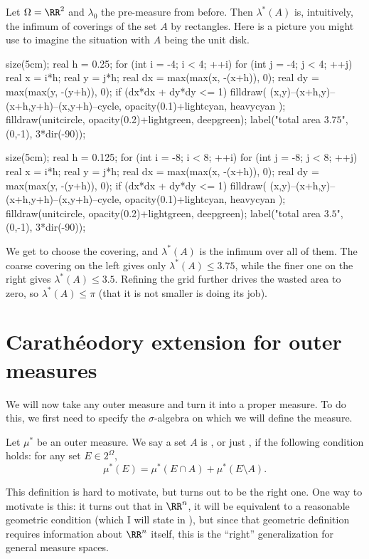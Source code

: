 \begin{example}
	Let $\Omega = \RR^2$ and $\lambda_0$ the pre-measure from before.
	Then $\lambda^\ast(A)$ is, intuitively,
	the infimum of coverings of the set $A$ by rectangles.
	Here is a picture you might use to imagine the
	situation with $A$ being the unit disk.
	\begin{center}
	\begin{asy}
		size(5cm);
		real h = 0.25;
		for (int i = -4; i < 4; ++i) {
			for (int j = -4; j < 4; ++j) {
				real x = i*h;
				real y = j*h;
				real dx = max(max(x, -(x+h)), 0);
				real dy = max(max(y, -(y+h)), 0);
				if (dx*dx + dy*dy <= 1)
					filldraw( (x,y)--(x+h,y)--(x+h,y+h)--(x,y+h)--cycle,
						opacity(0.1)+lightcyan, heavycyan );
			}
		}
		filldraw(unitcircle, opacity(0.2)+lightgreen, deepgreen);
		label("total area $3.75$", (0,-1), 3*dir(-90));
	\end{asy}
	\qquad
	\begin{asy}
		size(5cm);
		real h = 0.125;
		for (int i = -8; i < 8; ++i) {
			for (int j = -8; j < 8; ++j) {
				real x = i*h;
				real y = j*h;
				real dx = max(max(x, -(x+h)), 0);
				real dy = max(max(y, -(y+h)), 0);
				if (dx*dx + dy*dy <= 1)
					filldraw( (x,y)--(x+h,y)--(x+h,y+h)--(x,y+h)--cycle,
						opacity(0.1)+lightcyan, heavycyan );
			}
		}
		filldraw(unitcircle, opacity(0.2)+lightgreen, deepgreen);
		label("total area $3.5$", (0,-1), 3*dir(-90));
	\end{asy}
	\end{center}
	We get to choose the covering,
	and $\lambda^\ast(A)$ is the infimum over all of them.
	The coarse covering on the left gives only $\lambda^\ast(A) \le 3.75$,
	while the finer one on the right gives $\lambda^\ast(A) \le 3.5$.
	Refining the grid further drives the wasted area to zero,
	so $\lambda^\ast(A) \le \pi$
	(that it is not smaller is  doing its job).
\end{example}



\section{Carath\'{e}odory extension for outer measures}
We will now take any outer measure and turn it into a proper measure.
To do this, we first need to specify the $\sigma$-algebra
on which we will define the measure.

\begin{definition}
	Let $\mu^\ast$ be an outer measure.
	We say a set $A$ is , or just ,
	if the following condition holds:
	for any set $E \in 2^{\Omega}$,
	\[ \mu^\ast(E) = \mu^\ast(E \cap A) + \mu^\ast(E \setminus A). \]
\end{definition}
This definition is hard to motivate, but turns out to be the right one.
One way to motivate is this:
it turns out that in $\RR^n$,
it will be equivalent to a reasonable geometric condition
(which I will state in ),
but since that geometric definition requires information about $\RR^n$ itself,
this is the ``right'' generalization for general measure spaces.

